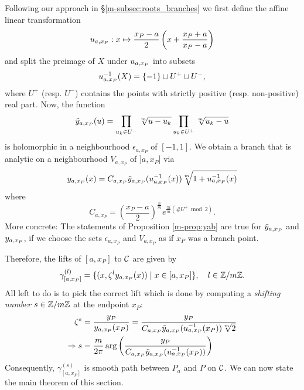 \documentclass[main.tex]{subfiles}
\begin{document}
  Following our approach in \S \ref{m-subsec:roots_branches} we first define the affine linear transformation
    \begin{equation}\label{def:uaxp}
      u_{a,x_P} : x \mapsto \frac{x_P-a}{2}\left(x+\frac{x_P+a}{x_P-a}\right)
  \end{equation}
   and split the preimage of $X$ under $u_{a,x_P}$ into subsets
  \begin{equation}
      u_{a,x_P}^{-1}(X) = \left\{-1\right\} \cup U^+ \cup U^-,
  \end{equation}
  where $U^+$ (resp. $U^-$) contains the points with strictly positive (resp. non-positive) real part. Now, the function
   \begin{align}
      \tilde{y}_{a,x_P}(u) = \prod_{u_k\in U^-} \sqrt[m]{u-u_k}\prod_{u_k\in U^+}\sqrt[m]{u_k-u}
  \end{align}
  is holomorphic in a neighbourhood $\epsilon_{a,x_P}$ of $[-1,1]$.
  We obtain a branch that is analytic on a neighbourhood $V_{a,x_P}$ of $]a,x_P]$ via
  \begin{equation}
    y_{a,x_P}(x) =   C_{a,x_P} \tilde{y}_{a,x_P}( u_{a,x_P}^{-1}(x) ) \sqrt[m]{1 + u_{a,x_P}^{-1}(x)}
  \end{equation}
  where
   \begin{equation}
      C_{a,x_P} = \left(\frac{x_P-a}{2}\right)^{\frac{n}{m}} e^{\frac{\pi i}{m}(\#U^+ \bmod 2)}.
  \end{equation}
  More concrete: The statements of Proposition \ref{m-prop:yab} are true for $\tilde{y}_{a,x_P}$ and $y_{a,x_P}$, if we choose the sets $\epsilon_{a,x_P}$ and $V_{a,x_P}$ as if $x_P$ was a branch point.
  
  Therefore, the lifts of $[a,x_P]$ to $\mathcal{C}$ are given by
    \begin{equation}\label{eq:def_path_axp}
      \gamma^{(l)}_{[a,x_P]} = \{  (x,\zeta^l y_{a,x_P}(x))  \mid  x \in [a,x_P]  \}, \quad l \in \mathbb{Z}/m\mathbb{Z}.
   \end{equation}
  All left to do is to pick the correct lift which is done by computing a \emph{shifting number} $s \in \mathbb{Z}/m\mathbb{Z}$ at the endpoint $x_P$:
  \begin{align}
   \zeta^s & = \frac{y_P}{y_{a,x_P}(x_P)} = \frac{y_P}{ C_{a,x_P} \tilde{y}_{a,x_P}( u_{a,x_P}^{-1}(x_P) ) \sqrt[m]{2}  } \\
   \Rightarrow s & = \frac{m}{2\pi} \arg\left(  \frac{y_P}{C_{a,x_P} \tilde{y}_{a,x_P}( u_{a,x_P}^{-1}(x_P) )} \right)
  \end{align}
  Consequently, $\gamma^{(s)}_{[a,x_P]}$ is smooth path between $P_a$ and $P$ on $\mathcal{C}$. We can now state the main theorem of this section.
  
\end{document}
